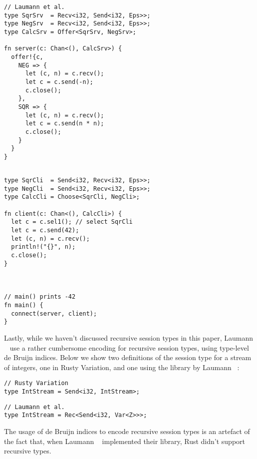 \documentclass[copyright,creativecommons]{eptcs}
\begin{document}
\vspace{-0.5\baselineskip}
\begin{minipage}[t]{0.5\linewidth}
\begin{lstlisting}
// Laumann et al.
type SqrSrv  = Recv<i32, Send<i32, Eps>>;
type NegSrv  = Recv<i32, Send<i32, Eps>>;
type CalcSrv = Offer<SqrSrv, NegSrv>;

fn server(c: Chan<(), CalcSrv>) {
  offer!{c,
    NEG => {
      let (c, n) = c.recv();
      let c = c.send(-n);
      c.close();
    },
    SQR => {
      let (c, n) = c.recv();
      let c = c.send(n * n);
      c.close();
    }
  }
}
\end{lstlisting}
\end{minipage}%
\begin{minipage}[t]{0.5\linewidth}
\begin{lstlisting}

type SqrCli  = Send<i32, Recv<i32, Eps>>;
type NegCli  = Send<i32, Recv<i32, Eps>>;
type CalcCli = Choose<SqrCli, NegCli>;

fn client(c: Chan<(), CalcCli>) {
  let c = c.sel1(); // select SqrCli
  let c = c.send(42);
  let (c, n) = c.recv();
  println!("{}", n);
  c.close();
}



// main() prints -42
fn main() {
  connect(server, client);
}
\end{lstlisting}
\end{minipage}

Lastly, while we haven't discussed recursive session types in this paper, Laumann \etal~\cite{jespersen2015} use a rather cumbersome encoding for recursive session types, using type-level de Bruijn indices. Below we show two definitions of the session type for a stream of integers, one in Rusty Variation, and one using the library by Laumann \etal~\cite{jespersen2015}:

\begin{minipage}{0.5\linewidth}
\begin{lstlisting}
// Rusty Variation
type IntStream = Send<i32, IntStream>;
\end{lstlisting}  
\end{minipage}%
\begin{minipage}{0.5\linewidth}
\begin{lstlisting}
// Laumann et al.
type IntStream = Rec<Send<i32, Var<Z>>>;
\end{lstlisting}  
\end{minipage}

\noindent
The usage of de Bruijn indices to encode recursive session types is an artefact of the fact that, when Laumann \etal~\cite{jespersen2015} implemented their library, Rust didn't support recursive types.
\end{document}
